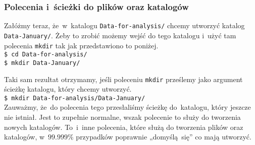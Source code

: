 \documentclass[10pt,t]{beamer}
\begin{document}
\begin{frame}
  \frametitle{Polecenia i~ścieżki do plików oraz katalogów}


  Załóżmy teraz, że~w~katalogu \texttt{Data-for-analysis/} chcemy utworzyć
  katalog \texttt{Data-January/}. Żeby to zrobić możemy wejść do tego
  katalogu i~użyć tam polecenia \texttt{mkdir} tak jak przedstawiono to
  poniżej. \\
  \texttt{\$ cd Data-for-analysis/} \\
  \texttt{\$ mkdir Data-January/}

  Taki sam rezultat otrzymamy, jeśli poleceniu \texttt{mkdir} prześlemy jako
  argument ścieżkę katalogu, który chcemy utworzyć. \\
  \texttt{\$ mkdir Data-for-analysis/Data-January/} \\
  Zauważmy, że~do polecenia tego przesłaliśmy ścieżkę do~katalogu,
  który \alert{jeszcze} nie istniał. Jest to zupełnie normalne, wszak
  polecenie to służy do tworzenia nowych katalogów. To~i~inne polecenia,
  które służą do tworzenia plików oraz katalogów, w~$99.999\%$ przypadków
  poprawnie „domyślą~się” co mają utworzyć.


\end{frame}
\end{document}
